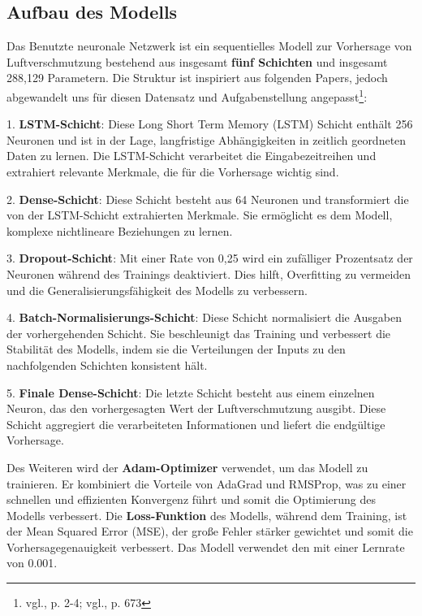\documentclass{article}
\begin{document}
\subsection{Aufbau des Modells}
Das Benutzte neuronale Netzwerk ist ein sequentielles Modell zur Vorhersage von Luftverschmutzung bestehend aus insgesamt \textbf{fünf Schichten} und insgesamt 288,129 Parametern. 
Die Struktur ist inspiriert aus folgenden Papers, jedoch abgewandelt uns für diesen Datensatz und Aufgabenstellung angepasst\footnote{vgl.\cite{tanRegressionAnalysisPrediction2021}, p. 2-4; vgl.\cite{LinearRegressionVs}, p. 673}:

1. \textbf{LSTM-Schicht}: Diese Long Short Term Memory (LSTM) Schicht enthält 256 Neuronen und ist in der Lage, langfristige Abhängigkeiten in zeitlich geordneten Daten zu lernen. 
Die LSTM-Schicht verarbeitet die Eingabezeitreihen und extrahiert relevante Merkmale, die für die Vorhersage wichtig sind.

2. \textbf{Dense-Schicht}: Diese Schicht besteht aus 64 Neuronen und transformiert die von der LSTM-Schicht extrahierten Merkmale.
Sie ermöglicht es dem Modell, komplexe nichtlineare Beziehungen zu lernen.

3. \textbf{Dropout-Schicht}: Mit einer Rate von 0,25 wird ein zufälliger Prozentsatz der Neuronen während des Trainings deaktiviert.
Dies hilft, Overfitting zu vermeiden und die Generalisierungsfähigkeit des Modells zu verbessern.

4. \textbf{Batch-Normalisierungs-Schicht}: Diese Schicht normalisiert die Ausgaben der vorhergehenden Schicht. Sie beschleunigt das Training und verbessert die Stabilität des Modells,
indem sie die Verteilungen der Inputs zu den nachfolgenden Schichten konsistent hält.

5. \textbf{Finale Dense-Schicht}: Die letzte Schicht besteht aus einem einzelnen Neuron, das den vorhergesagten Wert der Luftverschmutzung ausgibt.
Diese Schicht aggregiert die verarbeiteten Informationen und liefert die endgültige Vorhersage.

Des Weiteren wird der \textbf{Adam-Optimizer} verwendet, um das Modell zu trainieren. Er kombiniert die Vorteile von AdaGrad und RMSProp, was zu einer schnellen und effizienten Konvergenz führt und somit die Optimierung des Modells verbessert.
Die \textbf{Loss-Funktion} des Modells, während dem Training, ist der Mean Squared Error (MSE), der große Fehler stärker gewichtet und somit die Vorhersagegenauigkeit verbessert.
Das Modell verwendet den  mit einer Lernrate von 0.001.
\end{document}

